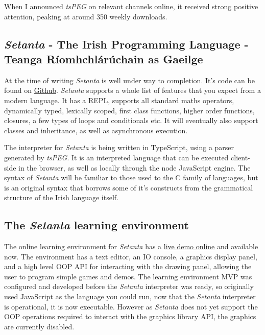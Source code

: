 \documentclass[11pt]{extarticle}
\newcommand{\Setanta}{\emph{Setanta}}
\newcommand{\tsPEG}{\emph{tsPEG}}
\begin{document}
            When I announced \tsPEG{} on relevant channels online, it received strong positive attention, peaking at around 350 weekly downloads.

        \subsection*{\Setanta{} - The Irish Programming Language - Teanga R\'iomhchl\'ar\'uchain as Gaeilge}

            At the time of writing \Setanta{} is well under way to completion. It's code can be found on \href{https://github.com/EoinDavey/Setanta}{Github}. \Setanta{} supports a whole list of features that you expect from a modern language. It has a REPL, supports all standard maths operators, dynamically typed, lexically scoped, first class functions, higher order functions, closures, a few types of loops and conditionals etc. It will eventually also support classes and inheritance, as well as asynchronous execution.

            The interpreter for \Setanta{} is being written in TypeScript, using a parser generated by \tsPEG{}.
            It is an interpreted language that can be executed client-side in the browser, as well as locally through the node JavaScript engine.
            The syntax of \Setanta{} will be familiar to those used to the C family of languages, but is an original syntax that borrows some of it's constructs from the grammatical structure of the Irish language itself.

        \subsection*{The \Setanta{} learning environment}

        The online learning environment for \Setanta{} has a \href{https://vey.ie/goto?go=fyp}{live demo online} and available now. The environment has a text editor, an IO console, a graphics display panel, and a high level OOP API for interacting with the drawing panel, allowing the user to program simple games and demos.
        The learning environment MVP was configured and developed before the \Setanta{} interpreter was ready, so originally used JavaScript as the language you could run, now that the \Setanta{} interpreter is operational, it is now executable. However as \Setanta{} does not yet support the OOP operations required to interact with the graphics library API, the graphics are currently disabled.
\end{document}
